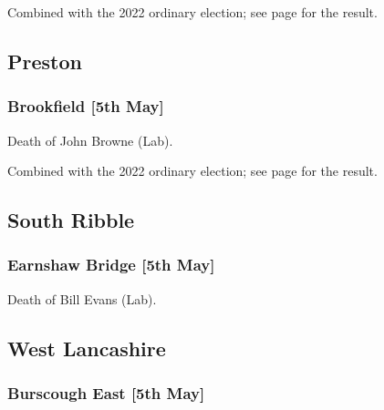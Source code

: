 \documentclass[a4paper,openany]{book}
\begin{document}
\begin{resultsiii}
Combined with the 2022 ordinary election; see page \pageref{PendleVivaryBridge} for the result.

\subsection*{Preston}

\subsubsection*{Brookfield \hspace*{\fill}\nolinebreak[1]%
	\enspace\hspace*{\fill}
	[5th May]}


Death of John Browne (Lab).

Combined with the 2022 ordinary election; see page \pageref{PrestonBrookfield} for the result.

\subsection*{South Ribble}

\subsubsection*{Earnshaw Bridge \hspace*{\fill}\nolinebreak[1]%
	\enspace\hspace*{\fill}
	[5th May]}


Death of Bill Evans (Lab).

\subsection*{West Lancashire}

\subsubsection*{Burscough East \hspace*{\fill}\nolinebreak[1]%
	\enspace\hspace*{\fill}
	[5th May]}



\end{resultsiii}
\end{document}
